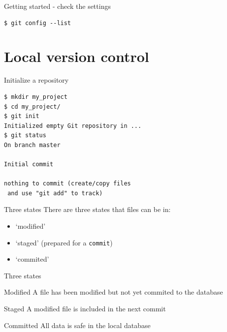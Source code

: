 \documentclass[
  11pt,
  american,
  ignorenonframetext,
  aspectratio=43,
  compress,
  xcolor=dvipsnames]{beamer}
\providecommand{\tightlist}{%
  \setlength{\itemsep}{0pt}\setlength{\parskip}{0pt}}
\begin{document}
\begin{frame}[fragile]{Getting started - check the settings}
\protect\hypertarget{getting-started---check-the-settings}{}
\begin{verbatim}
$ git config --list
\end{verbatim}
\end{frame}

\hypertarget{local-version-control-1}{%
\section{Local version control}\label{local-version-control-1}}

\begin{frame}[fragile]{Initialize a repository}
\protect\hypertarget{initialize-a-repository}{}
\begin{verbatim}
$ mkdir my_project
$ cd my_project/
$ git init
Initialized empty Git repository in ...
$ git status
On branch master

Initial commit

nothing to commit (create/copy files 
 and use "git add" to track)
\end{verbatim}
\end{frame}

\begin{frame}[fragile]{Three states}
\protect\hypertarget{three-states}{}
There are three states that files can be in:

\begin{itemize}
\tightlist
\item
  `modified'
\item
  `staged' (prepared for a \texttt{commit})
\item
  `commited'
\end{itemize}
\end{frame}

\begin{frame}{Three states}
\protect\hypertarget{three-states-1}{}
\begin{block}{Modified}
A file has been modified but not yet commited to the database
\end{block}

\begin{block}{Staged}
A modified file is included in the next commit
\end{block}

\begin{block}{Committed}
All data is safe in the local database
\end{block}
\end{frame}
\end{document}
